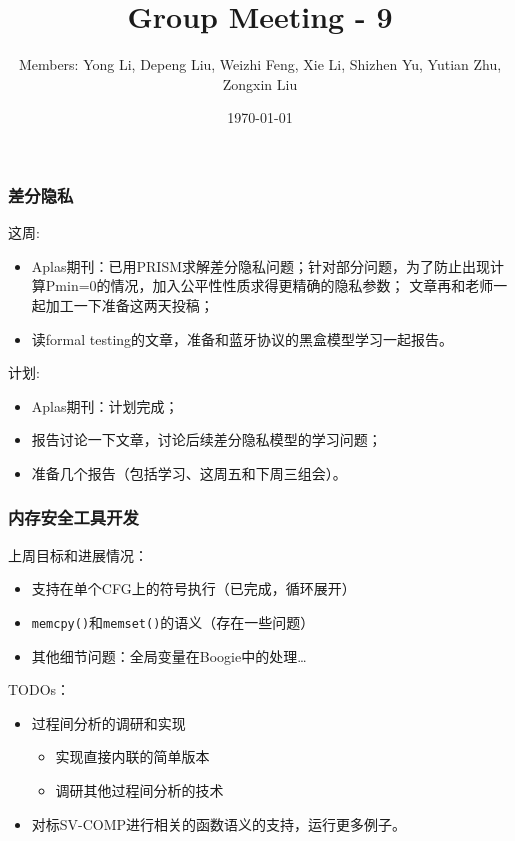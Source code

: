 \documentclass[aspectratio=1610, 13pt]{beamer}
\title{Group Meeting - 9}
\date{\today}
\author{Members: Yong Li, Depeng Liu, Weizhi Feng, Xie Li, Shizhen Yu, Yutian Zhu, Zongxin Liu}
\begin{document}
\maketitle

\begin{frame}\frametitle{差分隐私}
这周:
\begin{itemize}
  \item Aplas期刊：已用PRISM求解差分隐私问题；针对部分问题，为了防止出现计算Pmin=0的情况，加入公平性性质求得更精确的隐私参数；
  文章再和老师一起加工一下准备这两天投稿；
  \item 读formal testing的文章，准备和蓝牙协议的黑盒模型学习一起报告。
\end{itemize}

计划:
\begin{itemize}
  \item Aplas期刊：计划完成；
  \item 报告讨论一下文章，讨论后续差分隐私模型的学习问题；
  \item 准备几个报告（包括学习、这周五和下周三组会）。
\end{itemize}
\end{frame}

\begin{frame}\frametitle{内存安全工具开发}

上周目标和进展情况：
\begin{itemize}
\item 支持在单个CFG上的符号执行（已完成，循环展开）
\item \texttt{memcpy()}和\texttt{memset()}的语义（存在一些问题）

\item 其他细节问题：全局变量在Boogie中的处理…
\end{itemize}
TODOs：
\begin{itemize}

\item 过程间分析的调研和实现
\begin{itemize}
\item 实现直接内联的简单版本

\item 调研其他过程间分析的技术
\end{itemize}

\item 对标SV-COMP进行相关的函数语义的支持，运行更多例子。
\end{itemize}

 \end{frame}
 
\end{document}
